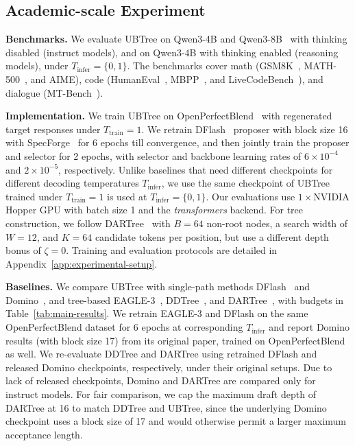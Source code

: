 \subsection{Academic-scale Experiment}
\label{sec:exp-main}
\label{sec:exp-setup}

\noindent\textbf{Benchmarks.}
We evaluate UBTree on Qwen3-4B and Qwen3-8B~\citep{yang2025qwen3} with thinking disabled (instruct models), and on Qwen3-4B with thinking enabled (reasoning models), under $T_{\mathrm{infer}}=\{0,1\}$. The benchmarks cover math (GSM8K~\citep{cobbe2021training}, MATH-500~\citep{lightman2024let}, and AIME), code (HumanEval~\citep{chen2021evaluating}, MBPP~\citep{austin2021program}, and LiveCodeBench~\citep{jain2025livecodebench}), and dialogue (MT-Bench~\citep{zheng2023judging}).

\noindent\textbf{Implementation.}
We train UBTree on OpenPerfectBlend~\citep{xu2024perfect} with regenerated target responses under $T_{\mathrm{train}}=1$. We retrain DFlash~\citep{chen2026dflash} proposer with block size 16 with SpecForge~\citep{li2026specforge} for 6 epochs till convergence, and then jointly train the proposer and selector for 2 epochs, with selector and backbone learning rates of $6\times10^{-4}$ and $2\times10^{-5}$, respectively. Unlike baselines that need different checkpoints for different decoding temperatures $T_{\mathrm{infer}}$, we use the same checkpoint of UBTree trained under $T_{\mathrm{train}}=1$ is used at $T_{\mathrm{infer}}=\{0,1\}$. Our evaluations use $1\times$NVIDIA Hopper GPU with batch size 1 and the \textit{transformers} backend. For tree construction, we follow DARTree~\citep{li2026dartree} with $B=64$ non-root nodes, a search width of $W=12$, and $K=64$ candidate tokens per position, but use a different depth bonus of $\zeta=0$. Training and evaluation protocols are detailed in Appendix~\ref{app:experimental-setup}.

\noindent\textbf{Baselines.}
We compare UBTree with single-path methods DFlash~\citep{chen2026dflash} and Domino~\citep{huang2026domino}, and tree-based EAGLE-3~\citep{li2026eagle}, DDTree~\citep{ringel2026accelerating}, and DARTree~\citep{li2026dartree}, with budgets in Table~\ref{tab:main-results}. We retrain EAGLE-3 and DFlash on the same OpenPerfectBlend dataset for 6 epochs at corresponding $T_{\mathrm{infer}}$ and report Domino results (with block size 17) from its original paper, trained on OpenPerfectBlend as well. We re-evaluate DDTree and DARTree using retrained DFlash and released Domino checkpoints, respectively, under their original setups. Due to lack of released checkpoints, Domino and DARTree are compared only for instruct models. For fair comparison, we cap the maximum draft depth of DARTree at 16 to match DDTree and UBTree, since the underlying Domino checkpoint uses a block size of 17 and would otherwise permit a larger maximum acceptance length.

